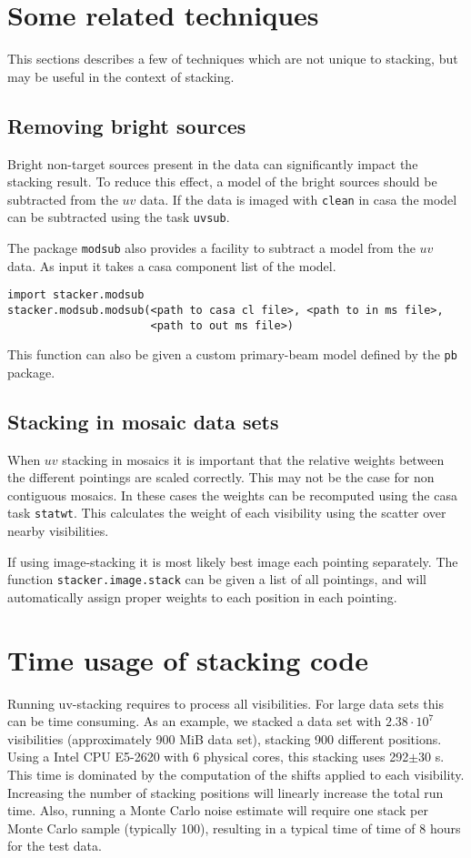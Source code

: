 \documentclass{article}
\begin{document}
\section{Some related techniques}
This sections describes a few of techniques
which are not unique to stacking, 
but may be useful in the context of stacking.

\subsection{Removing bright sources}
Bright non-target sources present in the data can significantly impact the stacking result.
To reduce this effect, a model of the bright sources should be subtracted from the $uv$ data.
If the data is imaged with {\tt clean} in casa the model can be subtracted using the task {\tt uvsub}.

The package {\tt modsub} also provides a facility to subtract a model from the $uv$ data.
As input it takes a casa component list of the model. 
\begin{verbatim}
import stacker.modsub
stacker.modsub.modsub(<path to casa cl file>, <path to in ms file>,
	                  <path to out ms file>)
\end{verbatim}
This function can also be given a custom primary-beam model defined by the {\tt pb} package.


\subsection{Stacking in mosaic data sets}
When $uv$ stacking in mosaics it is important that the relative weights between the different pointings are scaled correctly.
This may not be the case for non contiguous mosaics.
In these cases the weights can be recomputed using the casa task {\tt statwt}. 
This calculates the weight of each visibility using the scatter over nearby visibilities.

If using image-stacking it is most likely best image each pointing separately.
The function {\tt stacker.image.stack} can be given a list of all pointings,
and will automatically assign proper weights to each position in each pointing.


\section{Time usage of stacking code}
Running uv-stacking requires to process all visibilities. 
For large data sets this can be time consuming.
As an example, we stacked a data set with $2.38\cdot10^{7}$ visibilities (approximately 900 MiB data set),
stacking 900 different positions.
Using a Intel CPU E5-2620 with 6 physical cores, this stacking uses 292$\pm$30 s.
This time is dominated by the computation of the shifts applied to each visibility.
Increasing the number of stacking positions will linearly increase the total run time.
Also, running a Monte Carlo noise estimate will require one stack per Monte Carlo sample 
(typically 100), resulting in a typical time of time of 8 hours for the test data.
\end{document}
